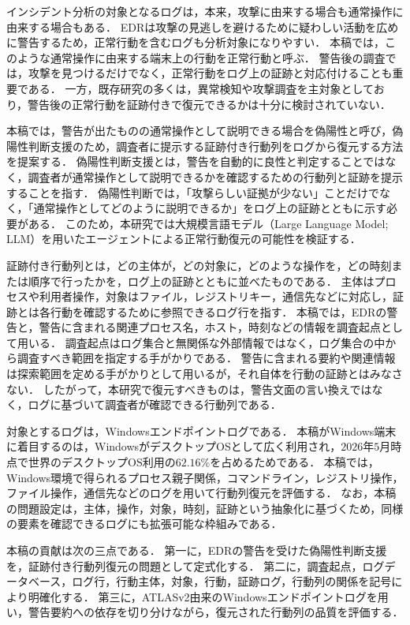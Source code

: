 \documentclass[a4paper,twocolumn,10pt]{article}
\begin{document}
インシデント分析の対象となるログは，本来，攻撃に由来する場合も通常操作に由来する場合もある．
EDRは攻撃の見逃しを避けるために疑わしい活動を広めに警告するため，正常行動を含むログも分析対象になりやすい．
本稿では，このような通常操作に由来する端末上の行動を正常行動と呼ぶ．
警告後の調査では，攻撃を見つけるだけでなく，正常行動をログ上の証跡と対応付けることも重要である．
一方，既存研究の多くは，異常検知や攻撃調査を主対象としており，警告後の正常行動を証跡付きで復元できるかは十分に検討されていない．

本稿では，警告が出たものの通常操作として説明できる場合を偽陽性と呼び，偽陽性判断支援のため，調査者に提示する証跡付き行動列をログから復元する方法を提案する．
偽陽性判断支援とは，警告を自動的に良性と判定することではなく，調査者が通常操作として説明できるかを確認するための行動列と証跡を提示することを指す．
偽陽性判断では，「攻撃らしい証拠が少ない」ことだけでなく，「通常操作としてどのように説明できるか」をログ上の証跡とともに示す必要がある．
このため，本研究では大規模言語モデル（Large Language Model; LLM）を用いたエージェントによる正常行動復元の可能性を検証する．

証跡付き行動列とは，どの主体が，どの対象に，どのような操作を，どの時刻または順序で行ったかを，ログ上の証跡とともに並べたものである．
主体はプロセスや利用者操作，対象はファイル，レジストリキー，通信先などに対応し，証跡とは各行動を確認するために参照できるログ行を指す．
本稿では，EDRの警告と，警告に含まれる関連プロセス名，ホスト，時刻などの情報を調査起点として用いる．
調査起点はログ集合と無関係な外部情報ではなく，ログ集合の中から調査すべき範囲を指定する手がかりである．
警告に含まれる要約や関連情報は探索範囲を定める手がかりとして用いるが，それ自体を行動の証跡とはみなさない．
したがって，本研究で復元すべきものは，警告文面の言い換えではなく，ログに基づいて調査者が確認できる行動列である．

対象とするログは，Windowsエンドポイントログである．
本稿がWindows端末に着目するのは，WindowsがデスクトップOSとして広く利用され，\(2026\)年\(5\)月時点で世界のデスクトップOS利用の\(62.16\%\)を占めるためである\cite{statcounter_desktop_os}．
本稿では，Windows環境で得られるプロセス親子関係，コマンドライン，レジストリ操作，ファイル操作，通信先などのログを用いて行動列復元を評価する．
なお，本稿の問題設定は，主体，操作，対象，時刻，証跡という抽象化に基づくため，同様の要素を確認できるログにも拡張可能な枠組みである．

本稿の貢献は次の三点である．
第一に，EDRの警告を受けた偽陽性判断支援を，証跡付き行動列復元の問題として定式化する．
第二に，調査起点，ログデータベース，ログ行，行動主体，対象，行動，証跡ログ，行動列の関係を記号により明確化する．
第三に，ATLASv2由来のWindowsエンドポイントログ\cite{atlasv2}を用い，警告要約への依存を切り分けながら，復元された行動列の品質を評価する．
\end{document}
